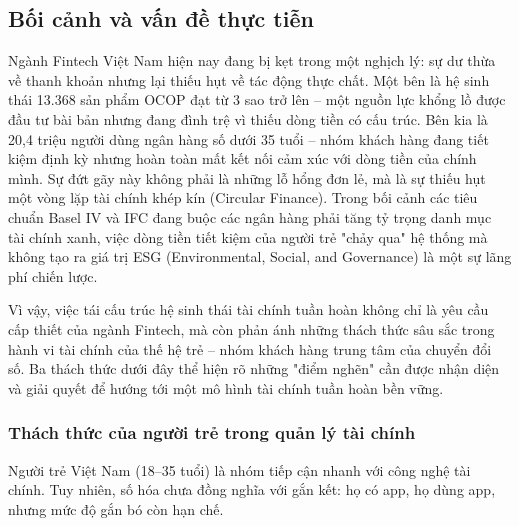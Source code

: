 \documentclass[13pt,a4paper]{extarticle}
\begin{document}
\subsection{Bối cảnh và vấn đề thực tiễn}

Ngành Fintech Việt Nam hiện nay đang bị kẹt trong một nghịch lý: sự dư thừa về thanh khoản nhưng lại thiếu hụt về tác động thực chất. Một bên là hệ sinh thái 13.368 sản phẩm OCOP đạt từ 3 sao trở lên – một nguồn lực khổng lồ được đầu tư bài bản nhưng đang đình trệ vì thiếu dòng tiền có cấu trúc. Bên kia là 20,4 triệu người dùng ngân hàng số dưới 35 tuổi – nhóm khách hàng đang tiết kiệm định kỳ nhưng hoàn toàn mất kết nối cảm xúc với dòng tiền của chính mình. Sự đứt gãy này không phải là những lỗ hổng đơn lẻ, mà là sự thiếu hụt một vòng lặp tài chính khép kín (Circular Finance). Trong bối cảnh các tiêu chuẩn Basel IV và IFC đang buộc các ngân hàng phải tăng tỷ trọng danh mục tài chính xanh, việc dòng tiền tiết kiệm của người trẻ "chảy qua" hệ thống mà không tạo ra giá trị ESG (Environmental, Social, and Governance) là một sự lãng phí chiến lược.

Vì vậy, việc tái cấu trúc hệ sinh thái tài chính tuần hoàn không chỉ là yêu cầu cấp thiết của ngành Fintech, mà còn phản ánh những thách thức sâu sắc trong hành vi tài chính của thế hệ trẻ – nhóm khách hàng trung tâm của chuyển đổi số. Ba thách thức dưới đây thể hiện rõ những "điểm nghẽn" cần được nhận diện và giải quyết để hướng tới một mô hình tài chính tuần hoàn bền vững.


\subsubsection{Thách thức của người trẻ trong quản lý tài chính}

Người trẻ Việt Nam (18--35 tuổi) là nhóm tiếp cận nhanh với công nghệ tài chính. Tuy nhiên, số hóa chưa đồng nghĩa với gắn kết: họ có app, họ dùng app, nhưng mức độ gắn bó còn hạn chế.
\end{document}
